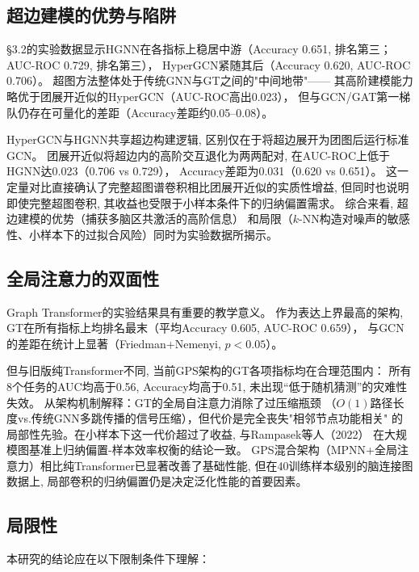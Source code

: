\documentclass[12pt,a4paper,heading=true,fontset=windows]{ctexart}
\newcommand{\kw}[1]{{\heiti #1}}
\begin{document}
\subsection{超边建模的优势与陷阱}

§3.2的实验数据显示HGNN在各指标上稳居中游（Accuracy 0.651, 排名第三；AUC-ROC 0.729, 排名第三），
HyperGCN紧随其后（Accuracy 0.620, AUC-ROC 0.706）。
超图方法整体处于传统GNN与GT之间的"中间地带"——
其高阶建模能力略优于团展开近似的HyperGCN（AUC-ROC高出0.023），
但与GCN/GAT第一梯队仍存在可量化的差距（Accuracy差距约0.05--0.08）。

HyperGCN与HGNN共享超边构建逻辑, 区别仅在于将超边展开为团图后运行标准GCN。
团展开近似将超边内的高阶交互退化为两两配对, 在AUC-ROC上低于HGNN达0.023（0.706 vs 0.729），
Accuracy差距为0.031（0.620 vs 0.651）。
这一定量对比直接确认了\kw{完整超图谱卷积相比团展开近似的实质性增益},
但同时也说明即使完整超图卷积, 其收益也受限于小样本条件下的归纳偏置需求。
综合来看, 超边建模的优势（捕获多脑区共激活的高阶信息）
和局限（$k$-NN构造对噪声的敏感性、小样本下的过拟合风险）同时为实验数据所揭示。

\subsection{全局注意力的双面性}

Graph Transformer的实验结果具有重要的教学意义。
作为表达上界最高的架构, GT在所有指标上均排名最末（平均Accuracy 0.605, AUC-ROC 0.659），
与GCN的差距在统计上显著（Friedman+Nemenyi, $p<0.05$）。

但与旧版纯Transformer不同, 当前GPS架构的GT各项指标均在合理范围内：
所有8个任务的AUC均高于0.56, Accuracy均高于0.51, 未出现``低于随机猜测''的灾难性失效。
从架构机制解释：GT的全局自注意力消除了\kw{过压缩}瓶颈
（$O(1)$路径长度vs.传统GNN多跳传播的信号压缩），但代价是完全丧失"相邻节点功能相关"
的局部性先验。在小样本下这一代价超过了收益,
与Rampasek等人（2022）\cite{rampasek2022recipe}
在大规模图基准上归纳偏置-样本效率权衡的结论一致。
GPS混合架构（MPNN+全局注意力）相比纯Transformer已显著改善了基础性能,
但在40训练样本级别的脑连接图数据上,
局部卷积的归纳偏置仍是决定泛化性能的首要因素。

\subsection{局限性}

本研究的结论应在以下限制条件下理解：
\end{document}
